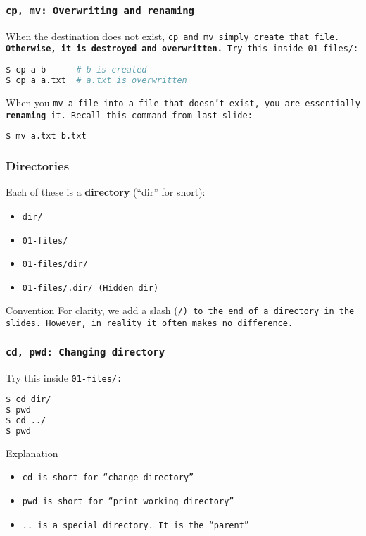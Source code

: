 \begin{frame}[fragile]
\frametitle{\tt{cp, mv}: Overwriting and renaming}
When the destination does not exist, \tt{cp} and \tt{mv} simply create
that file. \textbf{Otherwise, it is destroyed and overwritten.}
\newline \newline
Try this inside \tt{01-files/}:
\begin{lstlisting}[language=bash]
$ cp a b      # b is created
$ cp a a.txt  # a.txt is overwritten
\end{lstlisting}

When you \tt{mv} a file into a file that doesn't exist, you are essentially
\textbf{renaming} it. Recall this command from last slide:
\begin{lstlisting}[language=bash]
$ mv a.txt b.txt
\end{lstlisting}
\end{frame}

\begin{frame}
\frametitle{Directories}
Each of these is a \textbf{directory} (``dir'' for short):
\begin{itemize}
    \item \tt{dir/}
    \item \tt{01-files/}
    \item \tt{01-files/dir/}
    \item \tt{01-files/.dir/} (Hidden dir)
\end{itemize}

\begin{block}{Convention}
    For clarity, we add a slash (\tt{/}) to the end of a directory in the
    slides.    However, in reality it often makes no difference.
\end{block}
\end{frame}

\begin{frame}[fragile]
\frametitle{\tt{cd, pwd}: Changing directory}
Try this inside \tt{01-files/}:
\begin{lstlisting}[language=bash]
$ cd dir/
$ pwd
$ cd ../
$ pwd
\end{lstlisting}
\begin{block}{Explanation}
    \begin{itemize}
        \item \tt{cd} is short for ``change directory''
        \item \tt{pwd} is short for ``print working directory''
        \item \tt{..} is a special directory. It is the ``parent''
    \end{itemize}
\end{block}
\end{frame}

